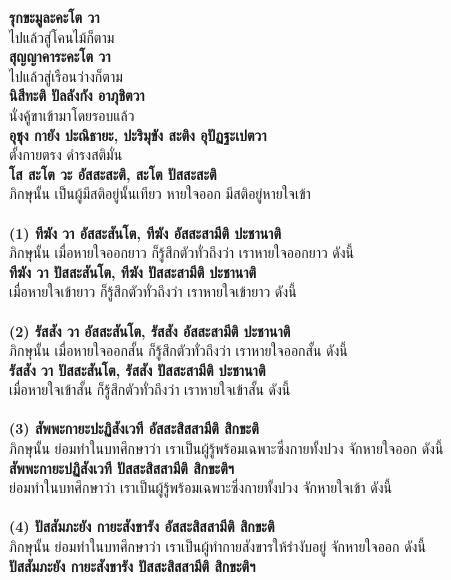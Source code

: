 \documentclass[12pt]{article}
\begin{document}
\textbf{รุกขะมูละคะโต วา}\\
\indent ไปแล้วสู่โคนไม้ก็ตาม\\
\textbf{สุญญาคาระคะโต วา}\\
\indent ไปแล้วสู่เรือนว่างก็ตาม\\
\textbf{นิสีทะติ ปัลลังกัง อาภุชิตวา}\\
\indent นั่งคู้ขาเข้ามาโดยรอบแล้ว\\
\textbf{อุชุง กายัง ปะณิธายะ, ปะริมุขัง สะติง อุปัฏฐะเปตวา}\\
\indent ตั้งกายตรง ดำรงสติมั่น\\
\textbf{โส สะโต วะ อัสสะสะติ, สะโต ปัสสะสะติ}\\
\indent ภิกษุนั้น เป็นผู้มีสติอยู่นั้นเทียว หายใจออก มีสติอยู่หายใจเข้า\\
\\
\textbf{(1) ทีฆัง วา อัสสะสันโต, ทีฆัง อัสสะสามีติ ปะชานาติ}\\
\indent ภิกษุนั้น เมื่อหายใจออกยาว ก็รู้สึกตัวทั่วถึงว่า เราหายใจออกยาว ดังนี้\\
\textbf{ทีฆัง วา ปัสสะสันโต, ทีฆัง ปัสสะสามีติ ปะชานาติ}\\
\indent เมื่อหายใจเข้ายาว ก็รู้สึกตัวทั่วถึงว่า เราหายใจเข้ายาว ดังนี้\\
\\
\textbf{(2) รัสสัง วา อัสสะสันโต, รัสสัง อัสสะสามีติ ปะชานาติ}\\
\indent ภิกษุนั้น เมื่อหายใจออกสั้น ก็รู้สึกตัวทั่วถึงว่า เราหายใจออกสั้น ดังนี้\\
\textbf{รัสสัง วา ปัสสะสันโต, รัสสัง ปัสสะสามีติ ปะชานาติ}\\
\indent เมื่อหายใจเข้าสั้น ก็รู้สึกตัวทั่วถึงว่า เราหายใจเข้าสั้น ดังนี้\\
\\
\textbf{(3) สัพพะกายะปะฏิสังเวที อัสสะสิสสามีติ สิกขะติ}\\
\indent ภิกษุนั้น ย่อมทำในบทศึกษาว่า เราเป็นผู้รู้พร้อมเฉพาะซึ่งกายทั้งปวง จักหายใจออก ดังนี้\\
\textbf{สัพพะกายะปฏิสังเวที ปัสสะสิสสามีติ สิกขะติฯ}\\
\indent ย่อมทำในบทศึกษาว่า เราเป็นผู้รู้พร้อมเฉพาะซึ่งกายทั้งปวง จักหายใจเข้า ดังนี้\\
\\
\textbf{(4) ปัสสัมภะยัง กายะสังขารัง อัสสะสิสสามีติ สิกขะติ}\\
\indent ภิกษุนั้น ย่อมทำในบทศึกษาว่า เราเป็นผู้ทำกายสังขารให้รำงับอยู่ จักหายใจออก ดังนี้\\
\textbf{ปัสสัมภะยัง กายะสังขารัง ปัสสะสิสสามีติ สิกขะติฯ}\\
\end{document}
